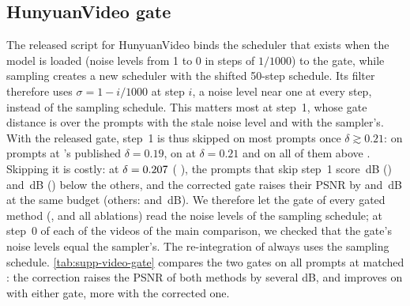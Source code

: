 \subsection{HunyuanVideo gate}
\label{supp:video-gate}
The released \seacache script for HunyuanVideo binds the scheduler that exists when the model is loaded (noise levels
from 1 to 0 in steps of $1/1000$) to the gate, while sampling creates a new scheduler with the shifted 50-step
schedule. Its \sea filter therefore uses $\sigma=1-i/1000$ at step $i$, a noise level near one at every step, instead
of the sampling schedule. This matters most at step~1, whose gate distance is \suppVidDOneRel{} over the
\suppVidStepN{} prompts with the stale noise level and \suppVidDOneLive{} with the sampler's. With the released gate,
step~1 is thus skipped on most prompts once $\delta\gtrsim0.21$: on \suppVidSkipAtPub{} prompts at \seacache's
published $\delta=0.19$, on \suppVidSkipAtTwoOne{} at $\delta=0.21$ and on all of them above \suppVidDOneRelMax.
Skipping it is
costly: at $\delta=0.207$ (\suppVidRelHiNfe{} \nfe), the \suppVidStepSkip{} prompts that skip step~1 score
\suppVidStepCostSea\,dB (\seacache) and \suppVidStepCostOurs\,dB (\ours) below the others, and the corrected gate raises
their PSNR by \suppVidStepFixSea{} and \suppVidStepFixOurs\,dB at the same budget (others: \suppVidStepFixSeaComp{} and
\suppVidStepFixOursComp\,dB). We therefore let the gate of every gated method (\seacache, \ours and all ablations) read
the noise levels of the sampling schedule; at step~0 of each of the \suppVidLiveCheckN{} videos of the main comparison,
we checked that the gate's noise levels equal the sampler's. The re-integration of \pcgs always uses the sampling
schedule. \cref{tab:supp-video-gate} compares the two gates on all prompts at matched \nfe: the correction raises the
PSNR of both methods by several dB, and \ours improves on \seacache with either gate, more with the corrected one.



